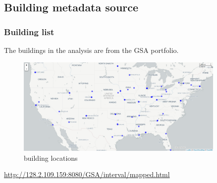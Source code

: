 \documentclass[12pt]{article}
\begin{document}
\subsection{Building metadata source}
\subsubsection{Building list}
The buildings in the analysis are from the GSA portfolio.
\begin{figure}[h!]
  \centering
  \includegraphics[width=0.9\textwidth]{images/study_set_loc.png}
  \caption{building locations}
  \label{fig:building_loc}
\end{figure}
\url{http://128.2.109.159:8080/GSA/interval/mapped.html}
\end{document}
